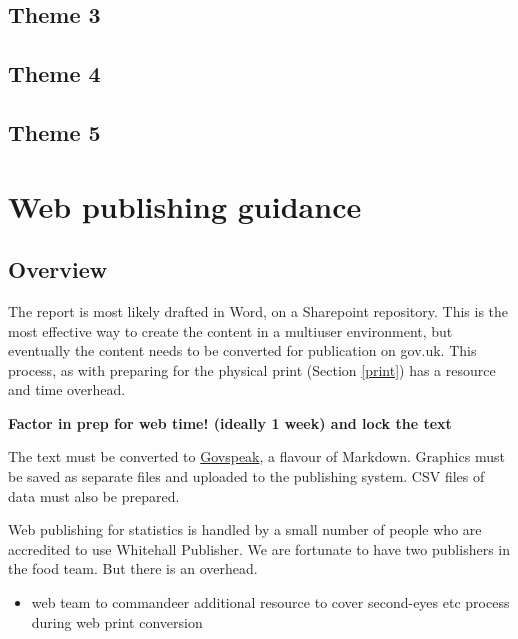 \documentclass[
]{book}
\providecommand{\tightlist}{%
  \setlength{\itemsep}{0pt}\setlength{\parskip}{0pt}}
\begin{document}
\hypertarget{theme-3}{%
\section{Theme 3}\label{theme-3}}

\hypertarget{theme-4}{%
\section{Theme 4}\label{theme-4}}

\hypertarget{theme-5}{%
\section{Theme 5}\label{theme-5}}

\hypertarget{web}{%
\chapter{Web publishing guidance}\label{web}}

\hypertarget{overview}{%
\section{Overview}\label{overview}}

The report is most likely drafted in Word, on a Sharepoint repository. This is
the most effective way to create the content in a multiuser environment, but
eventually the content needs to be converted for publication on gov.uk. This
process, as with preparing for the physical print (Section \ref{print}) has a
resource and time overhead.

\textbf{Factor in prep for web time! (ideally 1 week) and lock the text}

The text must be converted to
\href{https://govspeak-preview.publishing.service.gov.uk/guide}{Govspeak}, a flavour
of Markdown. Graphics must be saved as separate files and uploaded to the
publishing system. CSV files of data must also be prepared.

Web publishing for statistics is handled by a small number of people who are
accredited to use Whitehall Publisher. We are fortunate to have two publishers
in the food team. But there is an overhead.

\begin{itemize}
\tightlist
\item
  web team to commandeer additional resource to cover second-eyes etc process during web print conversion
\end{itemize}
\end{document}
